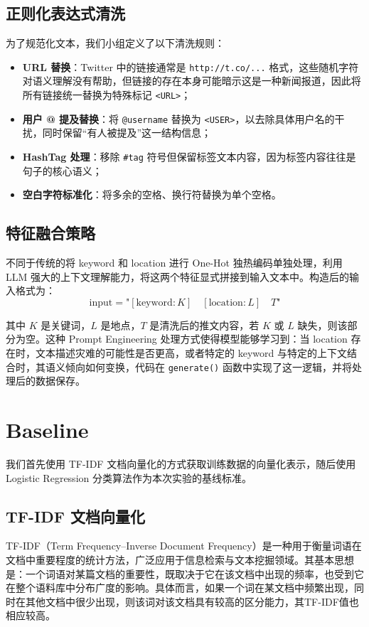 \documentclass[12pt, a4paper, UTF8]{ctexart}
\begin{document}
\subsection{正则化表达式清洗}
为了规范化文本，我们小组定义了以下清洗规则：

\begin{itemize}
    \item \textbf{URL 替换}：Twitter 中的链接通常是 \verb|http://t.co/...| 格式，这些随机字符对语义理解没有帮助，但链接的存在本身可能暗示这是一种新闻报道，因此将所有链接统一替换为特殊标记 \verb|<URL>|；
    \item \textbf{用户 @ 提及替换}：将 \verb|@username| 替换为 \verb|<USER>|，以去除具体用户名的干扰，同时保留“有人被提及”这一结构信息；
    \item \textbf{HashTag 处理}：移除 \verb|#tag| 符号但保留标签文本内容，因为标签内容往往是句子的核心语义；
    \item \textbf{空白字符标准化}：将多余的空格、换行符替换为单个空格。
\end{itemize}



\subsection{特征融合策略}
不同于传统的将 keyword 和 location 进行 One-Hot 独热编码单独处理，利用 LLM 强大的上下文理解能力，将这两个特征显式拼接到输入文本中。构造后的输入格式为：
\begin{equation}
    \text{input}=\texttt{"}[\text{keyword}: K]\quad[\text{location}: L]\quad T\texttt{"}
\end{equation}

其中 $K$ 是关键词，$L$ 是地点，$T$ 是清洗后的推文内容，若 $K$ 或 $L$ 缺失，则该部分为空。这种 Prompt Engineering 处理方式使得模型能够学习到：当 location 存在时，文本描述灾难的可能性是否更高，或者特定的 keyword 与特定的上下文结合时，其语义倾向如何变换，代码在 \verb|generate()| 函数中实现了这一逻辑，并将处理后的数据保存。



\section{Baseline}\label{sec:baseline}
我们首先使用 TF-IDF 文档向量化的方式获取训练数据的向量化表示，随后使用 Logistic Regression 分类算法作为本次实验的基线标准。



\subsection{TF-IDF 文档向量化}
TF-IDF（Term Frequency–Inverse Document Frequency）是一种用于衡量词语在文档中重要程度的统计方法，广泛应用于信息检索与文本挖掘领域。其基本思想是：一个词语对某篇文档的重要性，既取决于它在该文档中出现的频率，也受到它在整个语料库中分布广度的影响。具体而言，如果一个词在某文档中频繁出现，同时在其他文档中很少出现，则该词对该文档具有较高的区分能力，其TF-IDF值也相应较高。
\end{document}
